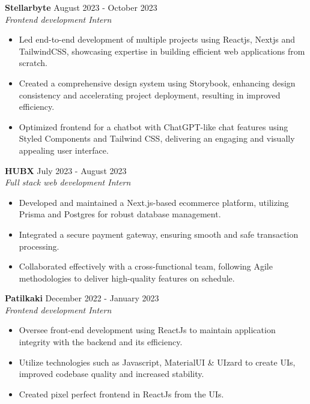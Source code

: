\documentclass[a4paper]{article}
\begin{document}
{\textbf{Stellarbyte }}\hfill August 2023 - October 2023 \\
 {\textit{Frontend development Intern }}  \
\vspace{-2.5mm}
\begin{itemize} 
\item Led end-to-end development of multiple projects using Reactjs, Nextjs and TailwindCSS, showcasing expertise in building efficient web applications from scratch.
\vspace{-2mm}
\item Created a comprehensive design system using Storybook, enhancing design consistency and accelerating project deployment, resulting in improved efficiency.
\item Optimized frontend for a chatbot with ChatGPT-like chat features using Styled Components and Tailwind CSS, delivering an engaging and visually appealing user interface.
\vspace{-2mm} 
\end{itemize}

{\textbf{HUBX }}\hfill July 2023 - August 2023 \\
 {\textit{Full stack web development Intern }}  \
\vspace{-2.5mm}
\begin{itemize} 
\item Developed and maintained a Next.js-based ecommerce platform, utilizing Prisma and Postgres for robust database management.
\vspace{-2mm}
\item Integrated a secure payment gateway, ensuring smooth and safe transaction processing.
\item Collaborated effectively with a cross-functional team, following Agile methodologies to deliver high-quality features on schedule.
\vspace{-2mm} 
\end{itemize}

{\textbf{Patilkaki }}\hfill December 2022 - January 2023 \\
 {\textit{Frontend development Intern }}  \
\vspace{-2.5mm}
\begin{itemize} 
\item Oversee front-end development using ReactJs to maintain application integrity with the backend and its efficiency.
\vspace{-2mm}
\item Utilize technologies such as Javascript, MaterialUI \& UIzard to
create UIs,
improved codebase quality and increased stability.
\vspace{-2mm}
\item Created pixel perfect frontend in ReactJs from the UIs. 
\end{itemize}
    
\end{document}
